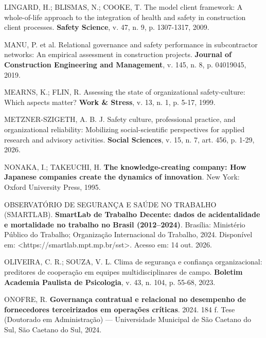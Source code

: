 \documentclass[12pt,a4paper]{article}
\begin{document}
\vspace{0.25cm}
\noindent LINGARD, H.; BLISMAS, N.; COOKE, T. The model client framework: A whole-of-life approach to the integration of health and safety in construction client processes. \textbf{Safety Science}, v. 47, n. 9, p. 1307-1317, 2009.

\vspace{0.25cm}
\noindent MANU, P. et al. Relational governance and safety performance in subcontractor networks: An empirical assessment in construction projects. \textbf{Journal of Construction Engineering and Management}, v. 145, n. 8, p. 04019045, 2019.

\vspace{0.25cm}
\noindent MEARNS, K.; FLIN, R. Assessing the state of organizational safety-culture: Which aspects matter? \textbf{Work \& Stress}, v. 13, n. 1, p. 5-17, 1999.

\vspace{0.25cm}
\noindent METZNER-SZIGETH, A. B. J. Safety culture, professional practice, and organizational reliability: Mobilizing social-scientific perspectives for applied research and advisory activities. \textbf{Social Sciences}, v. 15, n. 7, art. 456, p. 1-29, 2026.

\vspace{0.25cm}
\noindent NONAKA, I.; TAKEUCHI, H. \textbf{The knowledge-creating company: How Japanese companies create the dynamics of innovation}. New York: Oxford University Press, 1995.

\vspace{0.25cm}
\noindent OBSERVATÓRIO DE SEGURANÇA E SAÚDE NO TRABALHO (SMARTLAB). \textbf{SmartLab de Trabalho Decente: dados de acidentalidade e mortalidade no trabalho no Brasil (2012--2024)}. Brasília: Ministério Público do Trabalho; Organização Internacional do Trabalho, 2024. Disponível em: <https://smartlab.mpt.mp.br/sst>. Acesso em: 14 out. 2026.

\vspace{0.25cm}
\noindent OLIVEIRA, C. R.; SOUZA, V. L. Clima de segurança e confiança organizacional: preditores de cooperação em equipes multidisciplinares de campo. \textbf{Boletim Academia Paulista de Psicologia}, v. 43, n. 104, p. 55-68, 2023.

\vspace{0.25cm}
\noindent ONOFRE, R. \textbf{Governança contratual e relacional no desempenho de fornecedores terceirizados em operações críticas}. 2024. 184 f. Tese (Doutorado em Administração) — Universidade Municipal de São Caetano do Sul, São Caetano do Sul, 2024.
\end{document}
